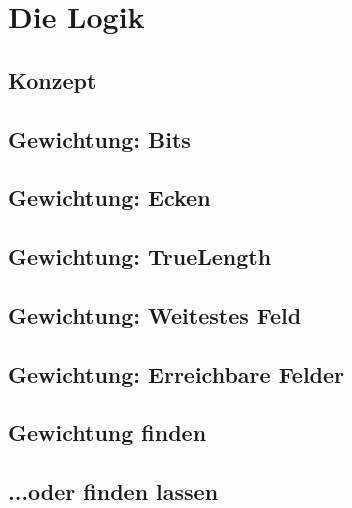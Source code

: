 \documentclass[12pt, draft]{beamer}
\begin{document}
\section{Die Logik}
\subsection{Konzept}
\begin{frame}
\end{frame}
\subsection{Gewichtung: Bits}
\begin{frame}
\end{frame}
\subsection{Gewichtung: Ecken}
\begin{frame}
\end{frame}
\subsection{Gewichtung: TrueLength}
\begin{frame}
\end{frame}
\subsection{Gewichtung: Weitestes Feld}
\begin{frame}
\end{frame}
\subsection{Gewichtung: Erreichbare Felder}
\begin{frame}
\end{frame}
\subsection{Gewichtung finden}
\begin{frame}
\end{frame}
\subsection{...oder finden lassen}
\begin{frame}
\end{frame}
\end{document}
